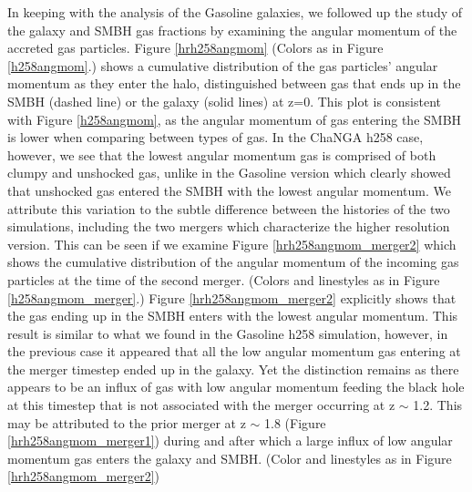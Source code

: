 \documentclass[12pt,headA,chapB]{fiskthesis}
\begin{document}
In keeping with the analysis of the Gasoline galaxies, we followed up the study of the galaxy and SMBH gas fractions by examining the angular momentum of the accreted gas particles. Figure \ref{hrh258angmom} (Colors as in Figure \ref{h258angmom}.) shows a cumulative distribution of the gas particles' angular momentum as they enter the halo, distinguished between gas that ends up in the SMBH (dashed line) or the galaxy (solid lines) at z=0. This plot is consistent with Figure \ref{h258angmom}, as the angular momentum of gas entering the SMBH is lower when comparing between types of gas. In the ChaNGA h258 case, however, we see that the lowest angular momentum gas is comprised of both clumpy and unshocked gas, unlike in the Gasoline version which clearly showed that unshocked gas entered the SMBH with the lowest angular momentum. We attribute this variation to the subtle difference between the histories of the two simulations, including the two mergers which characterize the higher resolution version. This can be seen if we examine Figure \ref{hrh258angmom_merger2} which shows the cumulative distribution of the angular momentum of the incoming gas particles at the time of the second merger. (Colors and linestyles as in Figure \ref{h258angmom_merger}.) Figure \ref{hrh258angmom_merger2} explicitly shows that the gas ending up in the SMBH enters with the lowest angular momentum. This result is similar to what we found in the Gasoline h258 simulation, however, in the previous case it appeared that all the low angular momentum gas entering at the merger timestep ended up in the galaxy. Yet the distinction remains as there appears to be an influx of gas with low angular momentum feeding the black hole at this timestep that is not associated with the merger occurring at z $\sim$ 1.2. This may be attributed to the prior merger at z $\sim$ 1.8 (Figure \ref{hrh258angmom_merger1}) during and after which a large influx of low angular momentum gas enters the galaxy and SMBH. (Color and linestyles as in Figure \ref{hrh258angmom_merger2}) 
\end{document}
